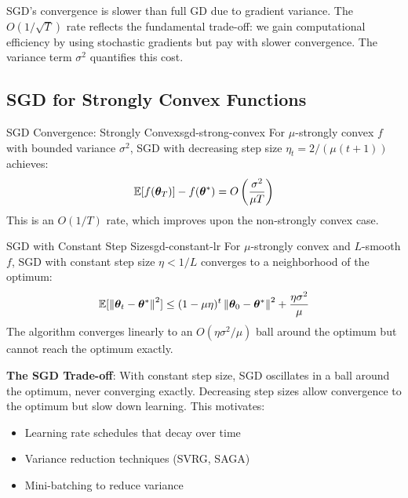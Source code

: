 \documentclass[../../main.tex]{subfiles}
\begin{document}
\begin{intuition}
SGD's convergence is slower than full GD due to gradient variance. The $O(1/\sqrt{T})$ rate reflects the fundamental trade-off: we gain computational efficiency by using stochastic gradients but pay with slower convergence. The variance term $\sigma^2$ quantifies this cost.
\end{intuition}

\subsection{SGD for Strongly Convex Functions}

\begin{theorem}{SGD Convergence: Strongly Convex}{sgd-strong-convex}
For $\mu$-strongly convex $f$ with bounded variance $\sigma^2$, SGD with decreasing step size $\eta_t = 2/(\mu(t+1))$ achieves:
\[
    \operatorname{\mathbb{E}}[f(\boldsymbol{\theta}_T)] - f(\boldsymbol{\theta}^*) = O\left(\frac{\sigma^2}{\mu T}\right)
\]
This is an $O(1/T)$ rate, which improves upon the non-strongly convex case.
\end{theorem}

\begin{theorem}{SGD with Constant Step Size}{sgd-constant-lr}
For $\mu$-strongly convex and $L$-smooth $f$, SGD with constant step size $\eta < 1/L$ converges to a neighborhood of the optimum:
\[
    \operatorname{\mathbb{E}}[\left\lVert \boldsymbol{\theta}_t - \boldsymbol{\theta}^* \right\rVert^2] \leq (1 - \mu\eta)^t \left\lVert \boldsymbol{\theta}_0 - \boldsymbol{\theta}^* \right\rVert^2 + \frac{\eta \sigma^2}{\mu}
\]
The algorithm converges linearly to an $O(\eta\sigma^2/\mu)$ ball around the optimum but cannot reach the optimum exactly.
\end{theorem}

\begin{important}
\textbf{The SGD Trade-off}: With constant step size, SGD oscillates in a ball around the optimum, never converging exactly. Decreasing step sizes allow convergence to the optimum but slow down learning. This motivates:
\begin{itemize}
    \item Learning rate schedules that decay over time
    \item Variance reduction techniques (SVRG, SAGA)
    \item Mini-batching to reduce variance
\end{itemize}
\end{important}
\end{document}

